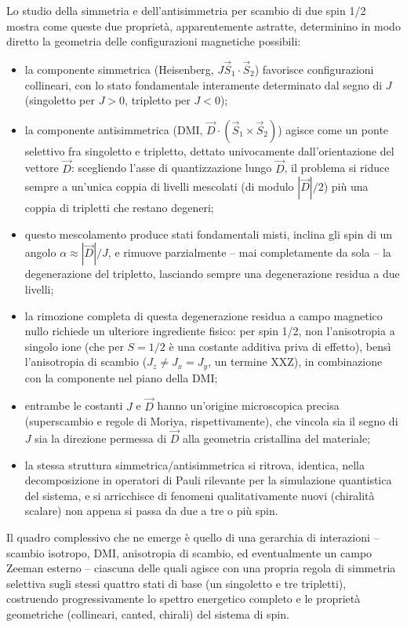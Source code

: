 \documentclass[11pt,a4paper]{article}
\begin{document}
Lo studio della simmetria e dell'antisimmetria per scambio di due spin 1/2 mostra come
queste due propriet\`a, apparentemente astratte, determinino in modo diretto la
geometria delle configurazioni magnetiche possibili:
\begin{itemize}
\item la componente simmetrica (Heisenberg, $J\vec S_1\cdot\vec S_2$) favorisce
configurazioni collineari, con lo stato fondamentale interamente determinato dal
segno di $J$ (singoletto per $J>0$, tripletto per $J<0$);
\item la componente antisimmetrica (DMI, $\vec D\cdot(\vec S_1\times\vec S_2)$) agisce
come un ponte selettivo fra singoletto e tripletto, dettato univocamente
dall'orientazione del vettore $\vec D$: scegliendo l'asse di quantizzazione lungo
$\vec D$, il problema si riduce sempre a un'unica coppia di livelli mescolati (di
modulo $|\vec D|/2$) pi\`u una coppia di tripletti che restano degeneri;
\item questo mescolamento produce stati fondamentali misti, inclina gli spin di un
angolo $\alpha\approx|\vec D|/J$, e rimuove parzialmente -- mai completamente da sola
-- la degenerazione del tripletto, lasciando sempre una degenerazione residua a due
livelli;
\item la rimozione completa di questa degenerazione residua a campo magnetico nullo
richiede un ulteriore ingrediente fisico: per spin 1/2, non l'anisotropia a singolo
ione (che per $S=1/2$ \`e una costante additiva priva di effetto), bens\`i
l'anisotropia di scambio ($J_z\neq J_x=J_y$, un termine XXZ), in combinazione con la
componente nel piano della DMI;
\item entrambe le costanti $J$ e $\vec D$ hanno un'origine microscopica precisa
(superscambio e regole di Moriya, rispettivamente), che vincola sia il segno di $J$
sia la direzione permessa di $\vec D$ alla geometria cristallina del materiale;
\item la stessa struttura simmetrica/antisimmetrica si ritrova, identica, nella
decomposizione in operatori di Pauli rilevante per la simulazione quantistica del
sistema, e si arricchisce di fenomeni qualitativamente nuovi (chiralit\`a scalare) non
appena si passa da due a tre o pi\`u spin.
\end{itemize}

Il quadro complessivo che ne emerge \`e quello di una gerarchia di interazioni --
scambio isotropo, DMI, anisotropia di scambio, ed eventualmente un campo Zeeman
esterno -- ciascuna delle quali agisce con una propria regola di simmetria selettiva
sugli stessi quattro stati di base (un singoletto e tre tripletti), costruendo
progressivamente lo spettro energetico completo e le propriet\`a geometriche
(collineari, canted, chirali) del sistema di spin.
\end{document}
